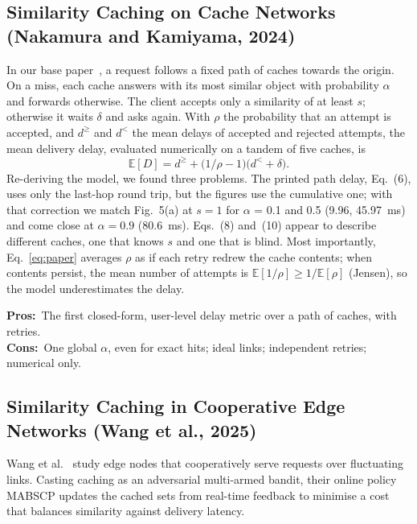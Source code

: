 \documentclass[11pt,a4paper]{article}
\newcommand{\pros}{\textcolor{green!50!black}{\textbf{Pros:}}~}
\newcommand{\cons}{\textcolor{red!70!black}{\textbf{Cons:}}~}
\begin{document}
\subsection{Similarity Caching on Cache Networks (Nakamura and Kamiyama, 2024)}
In our base paper~\cite{nakamura2024analysis}, a request follows a fixed path of caches towards the
origin. On a miss, each cache answers with its most similar object with probability $\alpha$ and
forwards otherwise. The client accepts only a similarity of at least $s$; otherwise it waits
$\delta$ and asks again. With $\rho$ the probability that an attempt is accepted, and $d^{\ge}$ and
$d^{<}$ the mean delays of accepted and rejected attempts, the mean delivery delay, evaluated
numerically on a tandem of five caches, is
\begin{equation}
  \mathbb{E}[D] = d^{\ge} + \bigl(1/\rho - 1\bigr)\bigl(d^{<} + \delta\bigr).
  \label{eq:paper}
\end{equation}
Re-deriving the model, we found three problems. The printed path delay, Eq.~(6), uses only the
last-hop round trip, but the figures use the cumulative one; with that correction we match
Fig.~5(a) at $s = 1$ for $\alpha$ = 0.1 and 0.5 (9.96, 45.97~ms) and come close at $\alpha = 0.9$
(80.6~ms). Eqs.~(8) and~(10) appear to describe different caches, one that knows $s$ and one that
is blind. Most importantly, Eq.~\eqref{eq:paper} averages $\rho$ as if each retry redrew the cache
contents; when contents persist, the mean number of attempts is
$\mathbb{E}[1/\rho] \ge 1/\mathbb{E}[\rho]$ (Jensen), so the model underestimates the delay.

\pros The first closed-form, user-level delay metric over a path of caches, with retries.\\
\cons One global $\alpha$, even for exact hits; ideal links; independent retries; numerical only.

\subsection{Similarity Caching in Cooperative Edge Networks (Wang et al., 2025)}
Wang et al.~\cite{wang2025bandit} study edge nodes that cooperatively serve requests over
fluctuating links. Casting caching as an adversarial multi-armed bandit, their online policy MABSCP
updates the cached sets from real-time feedback to minimise a cost that balances similarity
against delivery latency.
\end{document}
